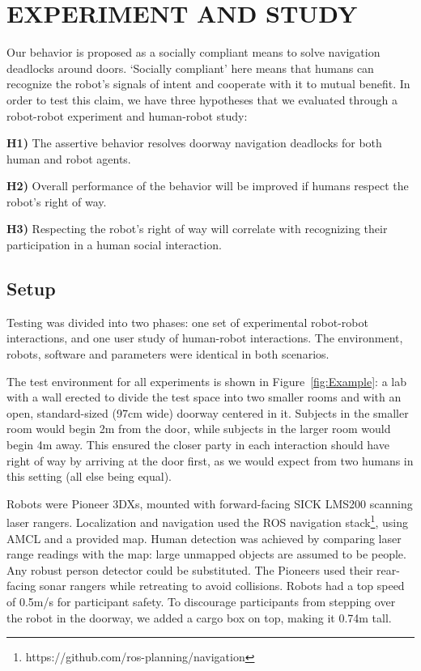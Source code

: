 \documentclass[letterpaper, 10 pt, conference]{ieeeconf}  %
\begin{document}

\section{EXPERIMENT AND STUDY}

Our behavior is proposed as a socially compliant means to solve navigation deadlocks around doors. `Socially compliant' here means that humans can recognize the robot's signals of intent and cooperate with it to mutual benefit. In order to test this claim, we have three hypotheses that we evaluated through a robot-robot experiment and human-robot study:

\textbf{H1)} The assertive behavior resolves doorway navigation deadlocks for both human and robot agents.

\textbf{H2)} Overall performance of the behavior will be improved if humans respect the robot's right of way.

\textbf{H3)} Respecting the robot's right of way will correlate with recognizing their participation in a human social interaction.


\subsection{Setup}

Testing was divided into two phases: one set of experimental robot-robot interactions, and one user study of human-robot interactions. The environment, robots, software and parameters were identical in both scenarios.

The test environment for all experiments is shown in Figure~\ref{fig:Example}: a lab with a wall erected to divide the test space into two smaller rooms and with an open, standard-sized (97cm wide) doorway centered in it. Subjects in the smaller room would begin 2m from the door, while subjects in the larger room would begin 4m away. This ensured the closer party in each interaction should have right of way by arriving at the door first, as we would expect from two humans in this setting (all else being equal).


Robots were Pioneer 3DXs, mounted with forward-facing SICK LMS200 scanning laser rangers. Localization and navigation used the ROS navigation stack\footnote{https://github.com/ros-planning/navigation}, using AMCL and a provided map. Human detection was achieved by comparing laser range readings with the map: large unmapped objects are assumed to be people. Any robust person detector could be substituted. The Pioneers used their rear-facing sonar rangers while retreating to avoid collisions. Robots had a top speed of 0.5m/s for participant safety. To discourage participants from stepping over the robot in the doorway, we added a cargo box on top, making it 0.74m tall.
\end{document}
